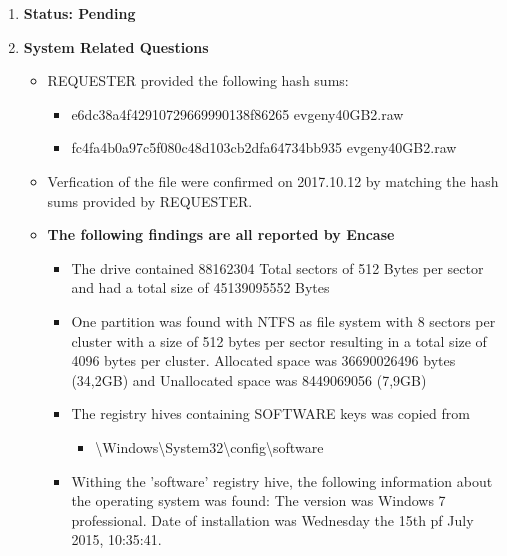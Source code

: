 \begin{enumerate}
\item \textbf{Status: Pending}\\
\item \textbf{System Related Questions}
	\begin{itemize}
	\item REQUESTER provided the following hash sums:
		\begin{itemize}
			\item e6dc38a4f42910729669990138f86265  evgeny\textunderscore 40GB\textunderscore2.raw
			\item fc4fa4b0a97c5f080c48d103cb2dfa64734bb935 evgeny\textunderscore 40GB\textunderscore2.raw
		\end{itemize}
	\item Verfication of the file were confirmed on 2017.10.12 by matching the hash sums provided by REQUESTER.
	\item \textbf{The following findings are all reported by Encase}
		\begin{itemize}
		\item The drive contained 88162304 Total sectors of 512 Bytes per sector 
			and had a total size of 45139095552 Bytes
		\item One partition was found with NTFS as file system with 8 sectors per cluster with a size
			of 512 bytes per sector resulting in a total size of 4096 bytes per cluster.
			Allocated space was 36690026496 bytes (34,2GB) and Unallocated space
			was 8449069056 (7,9GB)
			
			\item The registry hives containing SOFTWARE keys was copied from 
			\begin{itemize}
			
				\item \textbackslash Windows\textbackslash System32\textbackslash config\textbackslash software\\
				
			\end{itemize}
	
		\item Withing the 'software' registry hive, the following information about the operating system was found: The version was Windows 7 professional. Date of installation was Wednesday the 15th pf July 2015, 10:35:41.
		
		
		\end{itemize}
	
\end{itemize}



\end{enumerate}
